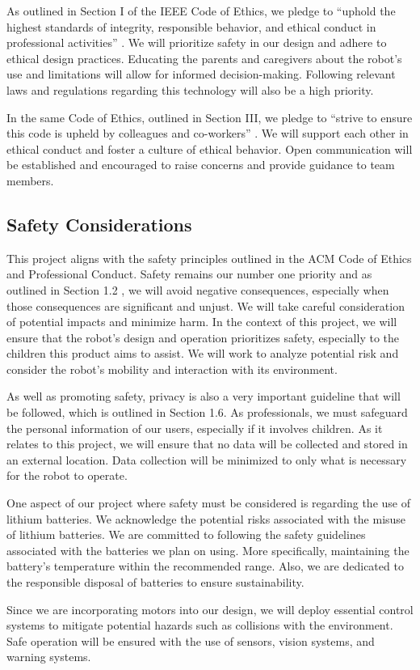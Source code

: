 \documentclass[journal,onecolumn, draftclsnofoot, 12pt]{IEEEtran}
\begin{document}
As outlined in Section I of the IEEE Code of Ethics, we pledge to “uphold the highest standards of integrity, responsible behavior, and ethical conduct in professional activities” \cite{IEEE_2020}. We will prioritize safety in our design and adhere to ethical design practices. Educating the parents and caregivers about the robot’s use and limitations will allow for informed decision-making. Following relevant laws and regulations regarding this technology will also be a high priority.

In the same Code of Ethics, outlined in Section III, we pledge to “strive to ensure this code is upheld by colleagues and co-workers” \cite{IEEE_2020}. We will support each other in ethical conduct and foster a culture of ethical behavior. Open communication will be established and encouraged to raise concerns and provide guidance to team members.

\subsection{Safety Considerations}
This project aligns with the safety principles outlined in the ACM Code of Ethics and Professional Conduct. Safety remains our number one priority and as outlined in Section 1.2 \cite{ACM_2018}, we will avoid negative consequences, especially when those consequences are significant and unjust. We will take careful consideration of potential impacts and minimize harm. In the context of this project, we will ensure that the robot’s design and operation prioritizes safety, especially to the children this product aims to assist. We will work to analyze potential risk and consider the robot’s mobility and interaction with its environment.

As well as promoting safety, privacy is also a very important guideline that will be followed, which is outlined in Section 1.6. As professionals, we must safeguard the personal information of our users, especially if it involves children. As it relates to this project, we will ensure that no data will be collected and stored in an external location. Data collection will be minimized to only what is necessary for the robot to operate.

One aspect of our project where safety must be considered is regarding the use of lithium batteries. We acknowledge the potential risks associated with the misuse of lithium batteries. We are committed to following the safety guidelines associated with the batteries we plan on using. More specifically, maintaining the battery’s temperature within the recommended range. Also, we are dedicated to the responsible disposal of batteries to ensure sustainability.

Since we are incorporating motors into our design, we will deploy essential control systems to mitigate potential hazards such as collisions with the environment. Safe operation will be ensured with the use of sensors, vision systems, and warning systems.

\newpage



\end{document}
